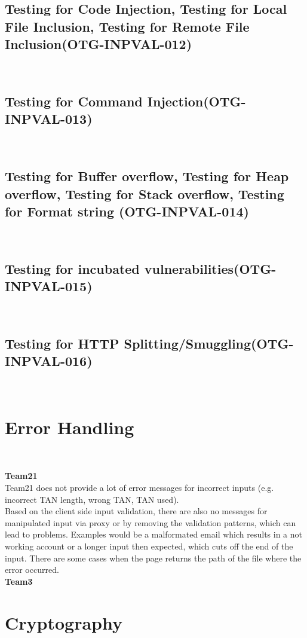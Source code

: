 \documentclass[headsepline,footsepline,footinclude=false,oneside,fontsize=11pt,paper=a4,listof=totoc,bibliography=totoc]{scrbook} %
\begin{document}
\subsection{Testing for Code Injection, Testing for Local File Inclusion, Testing for Remote File Inclusion(OTG-INPVAL-012)}\
\pagebreak
\subsection{Testing for Command Injection(OTG-INPVAL-013)}\
\pagebreak
\subsection{Testing for Buffer overflow, Testing for Heap overflow, Testing for Stack overflow, Testing for Format string (OTG-INPVAL-014)}\
\pagebreak
\subsection{Testing for incubated vulnerabilities(OTG-INPVAL-015)}\
\pagebreak
\subsection{Testing for HTTP Splitting/Smuggling(OTG-INPVAL-016)}\

\section{Error Handling}\

\textbf{Team21}\\

Team21 does not provide a lot of error messages for incorrect inputs (e.g. incorrect TAN
length, wrong TAN, TAN used). \\
Based on the client side input validation, there are also no messages for manipulated input via proxy or by removing the validation patterns, which can lead to problems. Examples would be a malformated email which results in a not working account or a longer input then expected, which cuts off the end of the input. There are some cases when the page returns the path of the file where the error occurred.\\

\textbf{Team3}\\


\section{Cryptography}\
\end{document}
